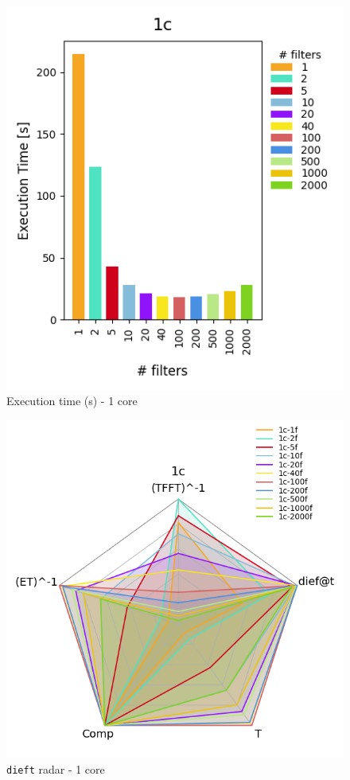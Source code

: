 \begin{figure}[H]
  \centering
  \includegraphics[scale = 0.5]{images/4-Experiments/E2/fixedcores/1c/execTime.png}
  \caption{Execution time (s) - 1 core}
\end{figure}

\begin{figure}[H]
  \centering
  \includegraphics[scale = 0.5]{images/4-Experiments/E2/fixedcores/1c/radar-dieft.png}
  \caption{\texttt{dieft} radar - 1 core}
\end{figure}

